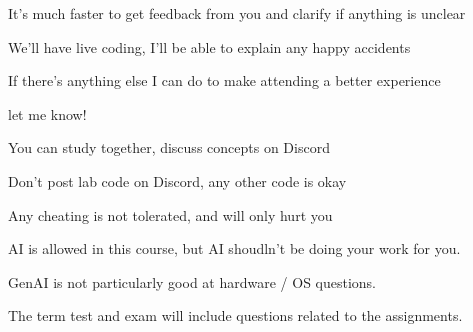 \begin{slide}
  

	It's much faster to get feedback from you and clarify if anything is unclear
	\medskip

	We'll have live coding, I'll be able to explain any happy accidents
	\medskip

	If there's anything else I can do to make attending a better experience

	let me know!
	
\end{slide}

\begin{slide}
  

	You can study together, discuss concepts on Discord
	\medskip

	Don't post lab code on Discord, any other code is okay
	\medskip

	Any cheating is not tolerated, and will only hurt you
	\bigskip
	\bigskip

	AI is allowed in this course, but AI shoudln't be doing your work for you.
	\medskip

	GenAI is not particularly good at hardware / OS questions.
	\medskip

	The term test and exam will include questions related to the assignments.
  
\end{slide}

